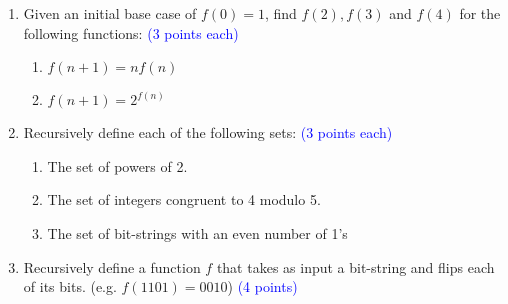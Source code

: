 \documentclass{article}
\newcommand{\pt}[1]{\textcolor{blue}{(#1 points)}}
\newcommand{\pte}[1]{\textcolor{blue}{(#1 points each)}}
\begin{document}
\begin{enumerate}
\item Given an initial base case of $f(0)=1$, find $f(2), f(3)$ and $f(4)$ for the following functions: \pte{3}
\begin{enumerate}
    \item $f(n + 1) = nf(n)$
    \item $f(n + 1) = 2^{f(n)}$
\end{enumerate}

\item Recursively define each of the following sets: \pte{3}
\begin{enumerate}
    \item The set of powers of 2.
    \item The set of integers congruent to 4 modulo 5.
    \item The set of bit-strings with an even number of 1's
\end{enumerate}

\item Recursively define a function $f$ that takes as input a bit-string and flips each of its bits. (e.g. $f(1101)=0010$) \pt{4}



\end{enumerate}
\end{document}
